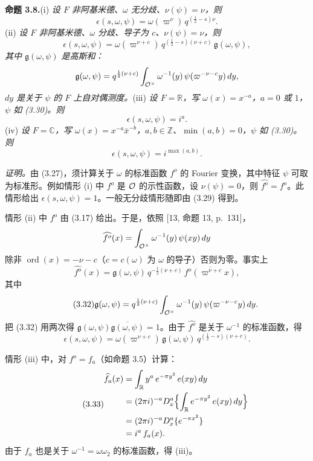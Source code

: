 \medskip\noindent\textbf{命题 3.8.}\quad (i) \emph{设 $F$ 非阿基米德、$\omega$ 无分歧、$\nu(\psi)=\nu$，则}
\[
\epsilon(s,\omega,\psi)=\omega(\varpi^\nu)\,q^{(\frac12-s)\nu}.
\]
(ii) \emph{设 $F$ 非阿基米德、$\omega$ 分歧、导子为 $c$、$\nu(\psi)=\nu$，则}
\[
\epsilon(s,\omega,\psi)=\omega(\varpi^{\nu+c})\,q^{(\frac12-s)(\nu+c)}\,\mathfrak g(\omega,\psi),
\]
\emph{其中 $\mathfrak g(\omega,\psi)$ 是高斯和：}
\[
\mathfrak g(\omega,\psi)=q^{\frac12(\nu+c)}\int_{\mathcal{O}^\times}\omega^{-1}(y)\,\psi(\varpi^{-\nu-c}y)\,dy,
\]
\emph{$dy$ 是关于 $\psi$ 的 $F$ 上自对偶测度。}(iii) \emph{设 $F=\mathbb R$，写 $\omega(x)=x^{-a}$，$a=0$ 或 $1$，$\psi$ 如 (3.30)。则}
\[
\epsilon(s,\omega,\psi)=i^a.
\]
(iv) \emph{设 $F=\mathbb C$，写 $\omega(x)=x^{-a}\bar x^{-b}$，$a,b\in\mathbb Z$、$\min(a,b)=0$，$\psi$ 如 (3.30)。则}
\[
\epsilon(s,\omega,\psi)=i^{\max(a,b)}.
\]

\emph{证明。}\quad 由 (3.27)，须计算关于 $\omega$ 的标准函数 $f^o$ 的 Fourier 变换，其中特征 $\psi$ 可取为标准形。例如情形 (i) 中 $f^o$ 是 $\mathcal{O}$ 的示性函数，设 $\nu(\psi)=0$，则 $\widehat{f^o}=f^o$。此情形给出 $\epsilon(s,\omega,\psi)=1$。一般无分歧情形随即由 (3.29) 得到。

情形 (ii) 中 $f^o$ 由 (3.17) 给出。于是，依照 [13, 命题 13, p.~131]，
\[
\widehat{f^o}(x)=\int_{\mathcal{O}^\times}\omega^{-1}(y)\,\psi(xy)\,dy
\]
除非 $\operatorname{ord}(x)=-\nu-c$（$c=c(\omega)$ 为 $\omega$ 的导子）否则为零。事实上
\begin{equation*}\tag{3.31}
\widehat{f^o}(x)=\mathfrak g(\omega,\psi)\,q^{-\frac12(\nu+c)}\,\overline{f^o(\varpi^{\nu+c}x)},
\end{equation*}
其中
\begin{equation*}\tag{3.32}
\mathfrak g(\omega,\psi)=q^{\frac12(\nu+c)}\int_{\mathcal{O}^\times}\omega^{-1}(y)\,\psi(\varpi^{-\nu-c}y)\,dy.
\end{equation*}
把 (3.32) 用两次得 $\mathfrak g(\omega,\psi)\overline{\mathfrak g(\omega,\psi)}=1$。由于 $\widehat{f^o}$ 是关于 $\omega^{-1}$ 的标准函数，得
\[
\epsilon(s,\omega,\psi)=\omega(\varpi^{\nu+c})\,\mathfrak g(\omega,\psi)\,q^{(\frac12-s)(\nu+c)}.
\]

情形 (iii) 中，对 $f^o=f_a$（如命题 3.5）计算：
\begin{equation*}\tag{3.33}
\begin{aligned}
\widehat{f_a}(x)&=\int_{\mathbb R}y^a\,e^{-\pi y^2}\,e(xy)\,dy\\
&=(2\pi i)^{-a}D_x^a\Bigl\{\int_{\mathbb R}e^{-\pi y^2}\,e(xy)\,dy\Bigr\}\\
&=(2\pi i)^{-a}D_x^a\{e^{-\pi x^2}\}\\
&=i^a\,f_a(x).
\end{aligned}
\end{equation*}
由于 $f_a$ 也是关于 $\omega^{-1}=\omega\omega_2$ 的标准函数，得 (iii)。

